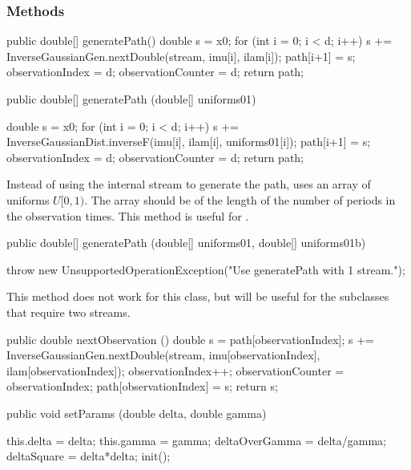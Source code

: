 \subsubsection* {Methods}
\begin{code}\begin{hide}

   public double[] generatePath() {
        double s = x0;
        for (int i = 0; i < d; i++) {
            s += InverseGaussianGen.nextDouble(stream, imu[i], ilam[i]);
            path[i+1] = s;
        }
        observationIndex   = d;
        observationCounter = d;
        return path;
    }\end{hide}

   public double[] generatePath (double[] uniforms01) \begin{hide} {
        double s = x0;
        for (int i = 0; i < d; i++) {
            s += InverseGaussianDist.inverseF(imu[i], ilam[i], uniforms01[i]);
            path[i+1] = s;
        }
        observationIndex   = d;
        observationCounter = d;
        return path;
    }\end{hide}
\end{code}
\begin{tabb}
Instead of using the internal stream to generate the path,
uses an array of uniforms $U[0,1)$.  The array should be
of the length of the number of periods in the observation
times. This method is useful for .
\end{tabb}
\begin{code}

   public double[] generatePath (double[] uniforms01, double[] uniforms01b) \begin{hide} {
       throw new UnsupportedOperationException("Use generatePath with 1 stream.");
    }\end{hide}
\end{code}
\begin{tabb}
This method does not work for this class, but will
be useful for the subclasses that require two streams.
\end{tabb}
\begin{code}\begin{hide}

   public double nextObservation () {
        double s = path[observationIndex];
        s += InverseGaussianGen.nextDouble(stream,
                  imu[observationIndex], ilam[observationIndex]);
        observationIndex++;
        observationCounter = observationIndex;
        path[observationIndex] = s;
        return s;
    }\end{hide}

   public void setParams (double delta, double gamma) \begin{hide} {
        this.delta = delta;
        this.gamma = gamma;
        deltaOverGamma = delta/gamma;
        deltaSquare    = delta*delta;
        init();
    }\end{hide}
\end{code}
